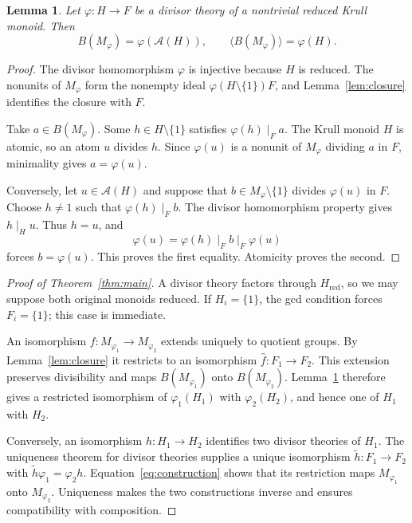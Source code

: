 \documentclass[11pt]{article}
\newtheorem{lemma}[theorem]{Lemma}
\theoremstyle{definition}
\newcommand{\A}{\mathcal A}
\begin{document}
\begin{lemma}\label{lem:atoms}
Let $\varphi:H\to F$ be a divisor theory of a nontrivial reduced Krull monoid. Then
\[
 B(M_\varphi)=\varphi(\A(H)),\qquad
 \langle B(M_\varphi)\rangle=\varphi(H).
\]
\end{lemma}
\begin{proof}
The divisor homomorphism $\varphi$ is injective because $H$ is reduced. The nonunits of $M_\varphi$ form the nonempty ideal $\varphi(H\setminus\{1\})F$, and Lemma~\ref{lem:closure} identifies the closure with $F$.

Take $a\in B(M_\varphi)$. Some $h\in H\setminus\{1\}$ satisfies $\varphi(h)\mid_F a$. The Krull monoid $H$ is atomic, so an atom $u$ divides $h$. Since $\varphi(u)$ is a nonunit of $M_\varphi$ dividing $a$ in $F$, minimality gives $a=\varphi(u)$.

Conversely, let $u\in\A(H)$ and suppose that $b\in M_\varphi\setminus\{1\}$ divides $\varphi(u)$ in $F$. Choose $h\ne1$ such that $\varphi(h)\mid_F b$. The divisor homomorphism property gives $h\mid_H u$. Thus $h=u$, and
\[
 \varphi(u)=\varphi(h)\mid_F b\mid_F\varphi(u)
\]
forces $b=\varphi(u)$. This proves the first equality. Atomicity proves the second.
\end{proof}

\begin{proof}[Proof of Theorem~\ref{thm:main}]
A divisor theory factors through $H_{\mathrm{red}}$, so we may suppose both original monoids reduced. If $H_i=\{1\}$, the gcd condition forces $F_i=\{1\}$; this case is immediate.

An isomorphism $f:M_{\varphi_1}\to M_{\varphi_2}$ extends uniquely to quotient groups. By Lemma~\ref{lem:closure} it restricts to an isomorphism $\widehat f:F_1\to F_2$. This extension preserves divisibility and maps $B(M_{\varphi_1})$ onto $B(M_{\varphi_2})$. Lemma~\ref{lem:atoms} therefore gives a restricted isomorphism of $\varphi_1(H_1)$ with $\varphi_2(H_2)$, and hence one of $H_1$ with $H_2$.

Conversely, an isomorphism $h:H_1\to H_2$ identifies two divisor theories of $H_1$. The uniqueness theorem for divisor theories \cite[Theorem 2.4.7]{GHK} supplies a unique isomorphism $\widetilde h:F_1\to F_2$ with $\widetilde h\varphi_1=\varphi_2h$. Equation~\eqref{eq:construction} shows that its restriction maps $M_{\varphi_1}$ onto $M_{\varphi_2}$. Uniqueness makes the two constructions inverse and ensures compatibility with composition.
\end{proof}
\end{document}

